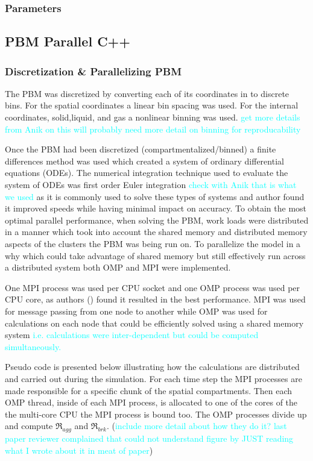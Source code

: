 \documentclass[preprint,11pt,authoryear]{elsarticle}
\begin{document}
	    \subsubsection{Parameters}
	    
	    
	  \subsection{PBM Parallel C++}
	    \subsubsection{Discretization \& Parallelizing PBM}
	    \par The PBM was discretized by converting each of its coordinates in to discrete bins. For the spatial coordinates a linear bin spacing was used. For the internal coordinates, solid,liquid, and gas a nonlinear binning was used. \textcolor{cyan}{get more details from Anik on this will probably need more detail on binning for reproducability}
	    \par Once the PBM had been discretized (compartmentalized/binned) a finite differences method was used which created a system of ordinary differential equations (ODEs). The numerical integration technique used to evaluate the system of ODEs was first order Euler integration \textcolor{cyan}{check with Anik that is what we used} as it is commonly used to solve these types of systems and author  found it improved speeds while having minimal impact on accuracy. To obtain the most optimal parallel performance, when solving the PBM, work loads were distributed in a manner which took into account the shared memory and distributed memory aspects of the clusters the PBM was being run on. To parallelize the model in a why which could take advantage of shared memory but still effectively run across a distributed system both OMP and MPI were implemented. 
	    \par One MPI process was used per CPU socket and one OMP process was used per CPU core, as authors (\cite{Bettencourt2017}) found it resulted in the best performance. MPI was used for message passing from one node to another while OMP was used for calculations on each node that could be efficiently solved using a shared memory system \textcolor{cyan}{i.e. calculations were inter-dependent but could be computed simultaneously.} 
	    \par Pseudo code is presented below illustrating how the calculations are distributed and carried out during the simulation. For each time step the MPI processes are made responsible for a specific chunk of the spatial compartments. Then each OMP thread, inside of each MPI process, is allocated to one of the cores of the the multi-core CPU the MPI process is bound too. The OMP processes divide up and compute $\Re_{agg}$ and $\Re_{brk}$. (\textcolor{cyan}{include more detail about how they do it? last paper reviewer complained that could not understand figure by JUST reading what I wrote about it in meat of paper}) 
\end{document}
